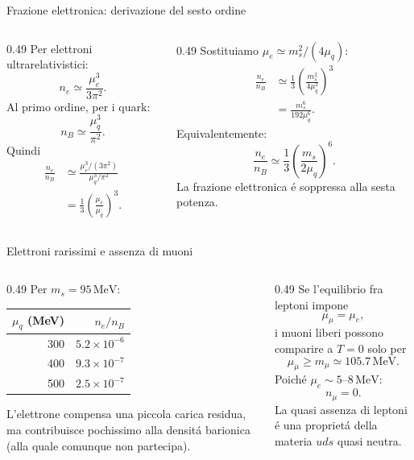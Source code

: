 \begin{frame}[t]{Frazione elettronica: derivazione del sesto ordine}
\small
\begin{columns}[T,onlytextwidth]
\begin{column}{0.49\textwidth}
Per elettroni ultrarelativistici:
\[
n_e\simeq\frac{\mu_e^3}{3\pi^2}.
\]
Al primo ordine, per i quark:
\[
n_B\simeq\frac{\mu_q^3}{\pi^2}.
\]
Quindi
\[
\begin{aligned}
\frac{n_e}{n_B}
&\simeq\frac{\mu_e^3/(3\pi^2)}
{\mu_q^3/\pi^2}\\
&=\frac13\left(\frac{\mu_e}{\mu_q}\right)^3.
\end{aligned}
\]
\end{column}
\begin{column}{0.49\textwidth}
Sostituiamo $\mu_e\simeq m_s^2/(4\mu_q)$:
\[
\begin{aligned}
\frac{n_e}{n_B}
&\simeq\frac13
\left(\frac{m_s^2}{4\mu_q^2}\right)^3\\
&=\frac{m_s^6}{192\mu_q^6}.
\end{aligned}
\]
Equivalentemente:
\[
\boxed{\frac{n_e}{n_B}\simeq
\frac13\left(\frac{m_s}{2\mu_q}\right)^6}.
\]
La frazione elettronica \'e soppressa alla sesta potenza.
\end{column}
\end{columns}
\end{frame}

\begin{frame}[t]{Elettroni rarissimi e assenza di muoni}
\small
\begin{columns}[T,onlytextwidth]
\begin{column}{0.49\textwidth}
Per $m_s=95\,\mathrm{MeV}$:
\begin{center}
\begin{tabular}{r|r}
$\mu_q$ (MeV) & $n_e/n_B$\\ \hline
300 & $5.2\times10^{-6}$\\
400 & $9.3\times10^{-7}$\\
500 & $2.5\times10^{-7}$
\end{tabular}
\end{center}
L'elettrone compensa una piccola carica residua, ma contribuisce pochissimo alla densit\'a barionica (alla quale comunque non partecipa).
\end{column}
\begin{column}{0.49\textwidth}
Se l'equilibrio fra leptoni impone
\[
\mu_\mu=\mu_e,
\]
i muoni liberi possono comparire a $T=0$ solo per
\[
\mu_\mu\ge m_\mu\simeq105.7\,\mathrm{MeV}.
\]
Poich\'e $\mu_e\sim5$--$8\,\mathrm{MeV}$:
\[
\boxed{n_\mu=0}.
\]
La quasi assenza di leptoni \'e una propriet\'a della materia $uds$ quasi neutra.
\end{column}
\end{columns}
\end{frame}

